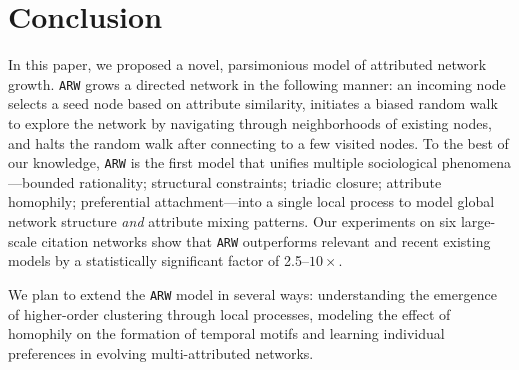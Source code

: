 \section{Conclusion}
\label{sec:Conclusion}

In this paper, we proposed a novel, parsimonious model of attributed network
growth. \texttt{ARW} grows a directed network in the following manner: an
incoming node selects a seed node based on attribute similarity, initiates a
biased random walk to explore the network by navigating through neighborhoods of
existing nodes, and halts the random walk after connecting to a few visited
nodes. To the best of our knowledge, \texttt{ARW} is the first model that
unifies multiple sociological phenomena---bounded rationality; structural
constraints; triadic closure; attribute homophily; preferential
attachment---into a single local process to model global network structure
\textit{and} attribute mixing patterns. Our experiments on six
large-scale citation networks show that \texttt{ARW} outperforms
relevant and recent existing models by a statistically significant
factor of 2.5--$10\times$.

We plan to extend the \texttt{ARW} model in several ways: understanding the
emergence of higher-order clustering \cite{yin2018higher} through local processes, modeling the
effect of homophily on the formation of temporal motifs \cite{paranjape2017motifs} and learning
individual preferences in evolving multi-attributed networks.




